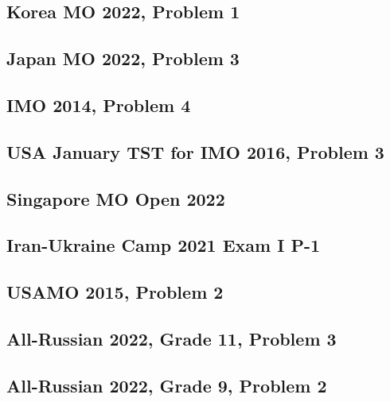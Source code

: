 \subsection{Korea MO 2022, Problem 1}


\subsection{Japan MO 2022, Problem 3}


\subsection{IMO 2014, Problem 4}


\subsection{USA January TST for IMO 2016, Problem 3}


\subsection{Singapore MO Open 2022}


\subsection{Iran-Ukraine Camp 2021 Exam I P-1}


\subsection{USAMO 2015, Problem 2}


\subsection{All-Russian 2022, Grade 11, Problem 3}


\subsection{All-Russian 2022, Grade 9, Problem 2}


